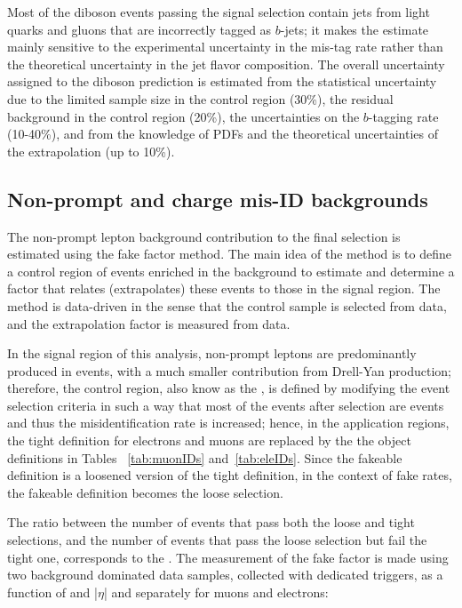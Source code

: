 Most of the diboson events passing the signal selection contain jets from light quarks and gluons that are incorrectly tagged as $b$-jets; it makes the estimate mainly sensitive to the experimental uncertainty in the mis-tag rate rather than the theoretical uncertainty in the jet flavor composition. The overall uncertainty assigned to the diboson prediction is estimated from the statistical uncertainty due to the limited sample size in the control region (30\%), the residual background in the control region (20\%), the uncertainties on the $b$-tagging rate (10-40\%), and from the knowledge of PDFs and the theoretical uncertainties of the extrapolation (up to 10\%).

\subsection{Non-prompt and charge mis-ID backgrounds}\label{ssec:fake_rate}

The non-prompt lepton background contribution to the final selection is estimated using the fake factor method. The main idea of the method is to define a control region of events enriched in the background to estimate and determine a factor that relates (extrapolates) these events to those in the signal region. The method is data-driven in the sense that the control sample is selected from data, and the extrapolation factor is measured from data.

In the signal region of this analysis, non-prompt leptons are predominantly produced in \ttbar events, with a much smaller contribution from Drell-Yan production; therefore, the control region, also know as the , is defined by modifying the event selection criteria in such a way that most of the events after selection are \ttbar events and thus the misidentification rate is increased; hence, in the application regions, the tight definition for electrons and muons are replaced by the the  object definitions in Tables ~\ref{tab:muonIDs} and~\ref{tab:eleIDs}. Since the fakeable definition is a loosened version of the tight definition, in the context of fake rates, the fakeable definition becomes the loose selection. 

The ratio between the number of events that pass both the loose and tight selections, and the number of events that pass the loose selection but fail the tight one, corresponds to the . The measurement of the fake factor is made using two background dominated data samples, collected with dedicated triggers, %
as a function of \pt and |$\eta$| and separately for muons and electrons:

